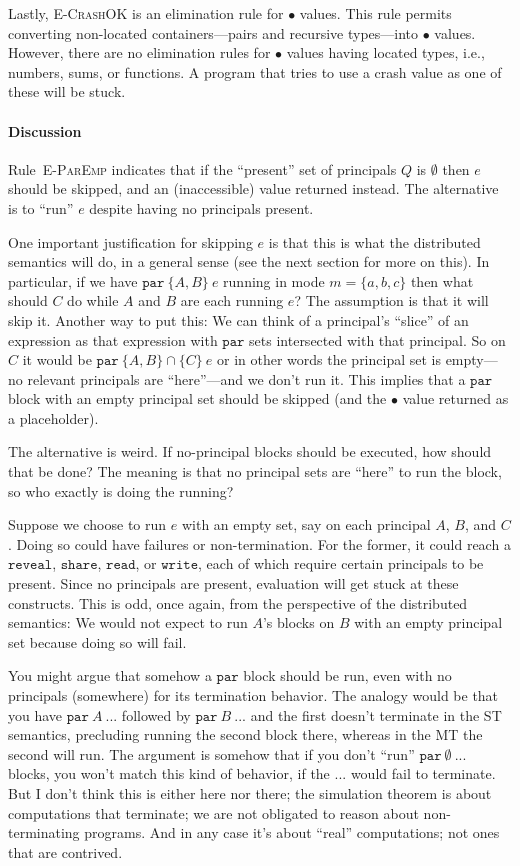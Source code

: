 \documentclass[10pt]{article}
\newcommand{\rulelab}[1]{{\small \textsc{#1}}}
\newcommand{\kw}[1]{\ensuremath{\mathtt{#1}}}
\newcommand{\epar}[2]{\ensuremath{\kw{par}~{#1}~{#2}}}
\newcommand{\vcrash}{\ensuremath{\bullet}}
\begin{document}
Lastly, \rulelab{E-CrashOK} is an elimination rule for $\vcrash$
values. This rule permits converting non-located containers---pairs
and recursive types---into $\vcrash$ values. However, there are no
elimination rules for $\vcrash$ values having located types, i.e.,
numbers, sums, or functions. A program that tries to use a crash value
as one of these will be stuck.

\paragraph{Discussion}

Rule~\rulelab{E-ParEmp} indicates that if the ``present'' set of
principals $Q$ is $\emptyset$ then $e$ should be skipped, and an
(inaccessible) value returned instead. The alternative is to ``run''
$e$ despite having no principals present.

One important justification for skipping $e$ is that this is what the
distributed semantics will do, in a general sense (see the next
section for more on this). In particular, if
we have $\epar{\{A,B\}}{e}$ running in mode $m = \{ a, b, c \}$ then
what should $C$ do while $A$ and $B$ are each running $e$? The
assumption is that it will skip it. Another way to put this: We can
think of a principal's ``slice'' of an expression as that expression
with $\kw{par}$ sets intersected with that principal. So on $C$ it
would be $\epar{\{A,B\} \cap \{C\}}{e}$ or in other words the
principal set is empty---no relevant principals are ``here''---and we
don't run it. This implies that a $\kw{par}$ block with an empty
principal set should be skipped (and the $\vcrash$ value returned as a
placeholder). 

The alternative is weird. If no-principal blocks should be executed,
how should that be done? The meaning is that no principal sets are
``here'' to run the block, so who exactly is doing the running? 

Suppose we choose to run $e$ with an empty set, say on each principal
$A$, $B$, and $C$. Doing so could have failures or non-termination. For the
former, it could reach a $\kw{reveal}$, $\kw{share}$, $\kw{read}$,
or $\kw{write}$, each of which require certain principals to be
present. Since no principals are present, evaluation will get stuck
at these constructs. This is odd, once again, from the perspective of
the distributed semantics: We would not expect to run $A$'s blocks on
$B$ with an empty principal set because doing so will fail.

You might argue that somehow a $\kw{par}$ block should be run, even
with no principals (somewhere) for its termination behavior. The
analogy would be that you have $\epar{A}{...}$ followed by
  $\epar{B}{...}$ and the first doesn't terminate in the ST semantics,
  precluding running the second block there, whereas in the MT the
  second will run. The argument is somehow that if you don't ``run''
  $\epar{\emptyset}{...}$ blocks, you won't match this kind of
    behavior, if the $...$ would fail to terminate. But I don't think this
is either here nor there; the simulation theorem is about computations
that terminate; we are not obligated to reason about non-terminating
programs. And in any case it's about ``real'' computations; not ones
that are contrived.
\end{document}
